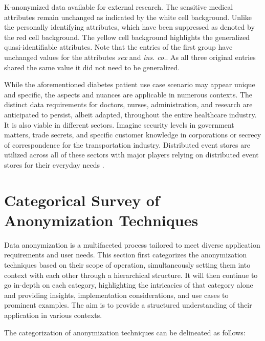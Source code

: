 \begin{table}[ht]
\begin{center}
{\begin{adjustbox}{center}
            \end{adjustbox}
        }
    \caption{K-anonymized data available for external research. The sensitive medical attributes remain unchanged as indicated by the white cell background. Unlike the personally identifying attributes, which have been suppressed as denoted by the red cell background. The yellow cell background highlights the generalized quasi-identifiable attributes. Note that the entries of the first group have unchanged values for the attributes \textit{sex} and \textit{ins. co.}. As all three original entries shared the same value it did not need to be generalized.}
    \label{table:k_anon}
    \end{center}
\end{table}

While the aforementioned diabetes patient use case scenario may appear unique and specific, the aspects and nuances are applicable in numerous contexts. The distinct data requirements for doctors, nurses, administration, and research are anticipated to persist, albeit adapted, throughout the entire healthcare industry. 
It is also viable in different sectors. Imagine security levels in government matters, trade secrets, and specific customer knowledge in corporations or secrecy of correspondence for the transportation industry. Distributed event stores are utilized across all of these sectors with major players relying on distributed event stores for their everyday needs \cite{kafka}. 

\section{Categorical Survey of Anonymization Techniques\label{sec:anonymization_hierarchy}}
Data anonymization is a multifaceted process tailored to meet diverse application requirements and user needs. This section first categorizes the anonymization techniques based on their scope of operation, simultaneously setting them into context with each other through a hierarchical structure. It will then continue to go in-depth on each category, highlighting the intricacies of that category alone and providing insights, implementation considerations, and use cases to prominent examples. The aim is to provide a structured understanding of their application in various contexts.\par

The categorization of anonymization techniques can be delineated as follows: 

